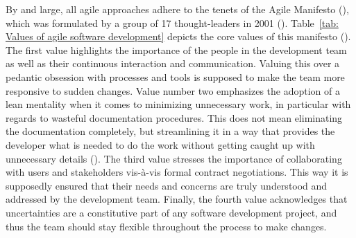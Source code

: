By and large, all agile approaches adhere to the tenets of the Agile Manifesto (\cite*{AgileManifesto2001}), which was formulated by a group of 17 thought-leaders in 2001 (\cite{Rigby2016a}). Table~\ref{tab: Values of agile software development} depicts the core values of this manifesto (\cite{Dingsoyr2012}). The first value highlights the importance of the people in the development team as well as their continuous interaction and communication. Valuing this over a pedantic obsession with processes and tools is supposed to make the team more responsive to sudden changes. Value number two emphasizes the adoption of a lean mentality when it comes to minimizing unnecessary work, in particular with regards to wasteful documentation procedures. This does not mean eliminating the documentation completely, but streamlining it in a way that provides the developer what is needed to do the work without getting caught up with unnecessary details (\cite{Eby2016}). The third value stresses the importance of collaborating with users and stakeholders vis-à-vis formal contract negotiations. This way it is supposedly ensured that their needs and concerns are truly understood and addressed by the development team. Finally, the fourth value acknowledges that uncertainties are a constitutive part of any software development project, and thus the team should stay flexible throughout the process to make changes.

\begin{wrapfigure}[8]{r}{0.6\textwidth}
	\centering
	\texttt{[image: \{"Latex/THESIS/Figures/Agile"]}.pdf}
	\caption[Agile development process]{Agile development process (Author's visualisation)}
	\label{fig:Agile development process}
\end{wrapfigure}

